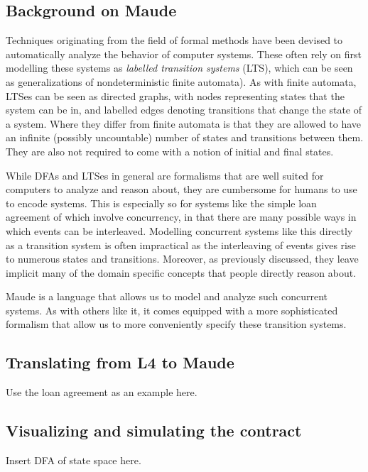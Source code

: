 \documentclass{article}
\begin{document}
\subsection{Background on Maude}
Techniques originating from the field of formal methods have been devised to
automatically analyze the behavior of computer systems.
These often rely on first modelling these systems as
\textit{labelled transition systems} (LTS), which can be seen as
generalizations of nondeterministic finite automata).
As with finite automata, LTSes can be seen as directed graphs, with nodes
representing states that the system can be in, and labelled edges denoting
transitions that change the state of a system.
Where they differ from finite automata is that they are allowed to have an
infinite (possibly uncountable) number of states and transitions
between them.
They are also not required to come with a notion of initial and final states.

While DFAs and LTSes in general are formalisms that are well suited for
computers to analyze and reason about, they are cumbersome for humans to use
to encode systems.
This is especially so for systems like the simple loan agreement of
\cite{contract_as_automaton} which involve concurrency, in that there are
many possible ways in which events can be interleaved.
Modelling concurrent systems like this directly as a transition system is
often impractical as the interleaving of events gives rise to numerous states
and transitions.
Moreover, as previously discussed, they leave implicit many of the domain
specific concepts that people directly reason about.

Maude is a language that allows us to model and analyze such concurrent systems.
As with others like it, it comes equipped with a more sophisticated formalism
that allow us to more conveniently specify these transition systems.

\subsection{Translating from L4 to Maude}
Use the loan agreement as an example here.

\subsection{Visualizing and simulating the contract}
Insert DFA of state space here.

\end{document}

